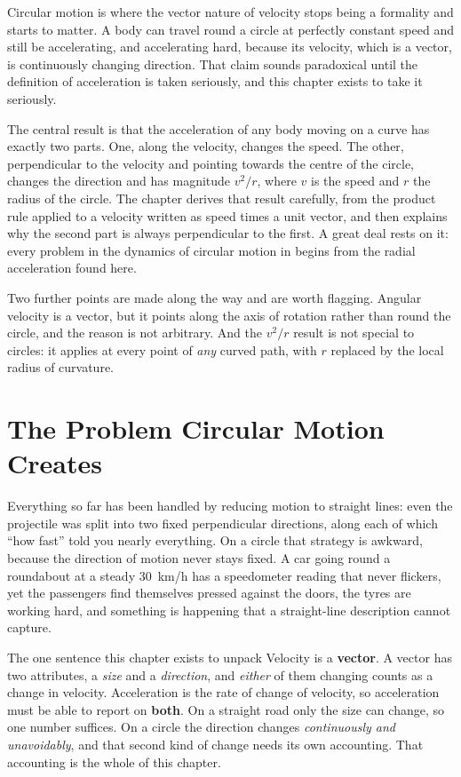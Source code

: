 \label{ch:circkin}

Circular motion is where the vector nature of velocity stops being a formality and starts to matter. A
body can travel round a circle at perfectly constant speed and still be accelerating, and accelerating
hard, because its velocity, which is a vector, is continuously changing direction. That claim sounds
paradoxical until the definition of acceleration is taken seriously, and this chapter exists to take it
seriously.

The central result is that the acceleration of any body moving on a curve has exactly two parts. One,
along the velocity, changes the speed. The other, perpendicular to the velocity and pointing towards the
centre of the circle, changes the direction and has magnitude $v^2/r$, where $v$ is the speed and $r$ the radius of the circle. The chapter derives that result
carefully, from the product rule applied to a velocity written as speed times a unit vector, and then
explains why the second part is always perpendicular to the first. A great deal rests on it: every
problem in the dynamics of circular motion in  begins from the radial acceleration found here.

Two further points are made along the way and are worth flagging. Angular velocity is a vector, but it
points along the axis of rotation rather than round the circle, and the reason is not arbitrary. And the
$v^2/r$ result is not special to circles: it applies at every point of \emph{any} curved path, with $r$
replaced by the local radius of curvature.

\section{The Problem Circular Motion Creates}

Everything so far has been handled by reducing motion to straight lines: even the projectile was split
into two fixed perpendicular directions, along each of which ``how fast'' told you nearly everything. On a
circle that strategy is awkward, because the direction of motion never stays fixed. A car going round a roundabout at a steady \SI{30}{km/h} has a
speedometer reading that never flickers, yet the passengers find themselves pressed against the doors,
the tyres are working hard, and something is happening that a straight-line description cannot capture.

\begin{motivbox}{The one sentence this chapter exists to unpack}
Velocity is a \textbf{vector}. A vector has two attributes, a \emph{size} and a \emph{direction},
and \emph{either} of them changing counts as a change in velocity. Acceleration is the rate of change of
velocity, so acceleration must be able to report on \textbf{both}. On a straight road only the size can
change, so one number suffices. On a circle the direction changes \emph{continuously and unavoidably},
and that second kind of change needs its own accounting. That accounting is the whole of this chapter.
\end{motivbox}

